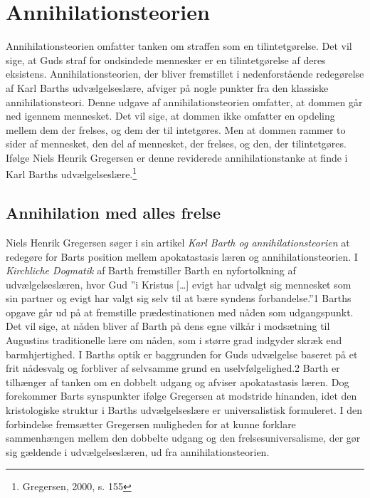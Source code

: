 \chapter{Annihilationsteorien}
Annihilationsteorien omfatter tanken om straffen som en tilintetgørelse. Det vil sige, at Guds straf for ondsindede mennesker er en tilintetgørelse af deres eksistens. Annihilationsteorien, der bliver fremstillet i nedenforstående redegørelse af Karl Barths udvælgelseslære, afviger på nogle punkter fra den klassiske annihilationsteori. Denne udgave af annihilationsteorien omfatter, at dommen går ned igennem mennesket. Det vil sige, at dommen ikke omfatter en opdeling mellem dem der frelses, og dem der til intetgøres. Men at dommen rammer to sider af mennesket, den del af mennesket, der frelses, og den, der tilintetgøres. Ifølge Niels Henrik Gregersen er denne reviderede annihilationstanke at finde i Karl Barths udvælgelseslære.\footnote{Gregersen, 2000, s. 155}   

\section{Annihilation med alles frelse}
Niels Henrik Gregersen søger i sin artikel \textit{Karl Barth og annihilationsteorien} at redegøre for Barts position mellem apokatastasis læren og annihilationsteorien. I \textit{Kirchliche Dogmatik} af Barth fremstiller Barth en nyfortolkning af udvælgelseslæren, hvor Gud ”i Kristus […] evigt har udvalgt sig mennesket som sin partner og evigt har valgt sig selv til at bære syndens forbandelse.”1 Barths opgave går ud på at fremstille prædestinationen med nåden som udgangspunkt. Det vil sige, at nåden bliver af Barth på dens egne vilkår i modsætning til Augustins traditionelle lære om nåden, som i større grad indgyder skræk end barmhjertighed. I Barths optik er baggrunden for Guds udvælgelse baseret på et frit nådesvalg og forbliver af selvsamme grund en uselvfølgelighed.2 Barth er tilhænger af tanken om en dobbelt udgang og afviser apokatastasis læren. Dog forekommer Barts synspunkter ifølge Gregersen at modstride hinanden, idet den kristologiske struktur i Barths udvælgelseslære er universalistisk formuleret. I den forbindelse fremsætter Gregersen muligheden for at kunne forklare sammenhængen mellem den dobbelte udgang og den frelsesuniversalisme, der gør sig gældende i udvælgelseslæren, ud fra annihilationsteorien.

